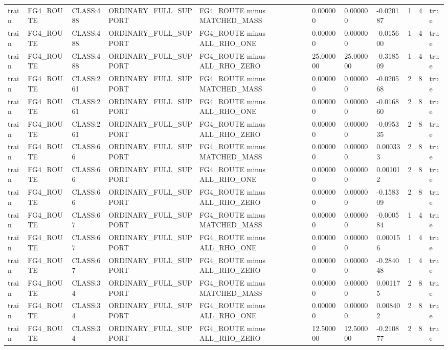 \begin{tabular}{lllllllllll}
train & FG4\_ROUTE & CLASS:488 & ORDINARY\_FULL\_SUPPORT & FG4\_ROUTE minus MATCHED\_MASS & 0.000000 & 0.000000 & -0.020187 & 1 & 4 & true \\
train & FG4\_ROUTE & CLASS:488 & ORDINARY\_FULL\_SUPPORT & FG4\_ROUTE minus ALL\_RHO\_ONE & 0.000000 & 0.000000 & -0.015600 & 1 & 4 & true \\
train & FG4\_ROUTE & CLASS:488 & ORDINARY\_FULL\_SUPPORT & FG4\_ROUTE minus ALL\_RHO\_ZERO & 25.000000 & 25.000000 & -0.318509 & 1 & 4 & true \\
train & FG4\_ROUTE & CLASS:261 & ORDINARY\_FULL\_SUPPORT & FG4\_ROUTE minus MATCHED\_MASS & 0.000000 & 0.000000 & -0.020568 & 2 & 8 & true \\
train & FG4\_ROUTE & CLASS:261 & ORDINARY\_FULL\_SUPPORT & FG4\_ROUTE minus ALL\_RHO\_ONE & 0.000000 & 0.000000 & -0.016860 & 2 & 8 & true \\
train & FG4\_ROUTE & CLASS:261 & ORDINARY\_FULL\_SUPPORT & FG4\_ROUTE minus ALL\_RHO\_ZERO & 0.000000 & 0.000000 & -0.095335 & 2 & 8 & true \\
train & FG4\_ROUTE & CLASS:66 & ORDINARY\_FULL\_SUPPORT & FG4\_ROUTE minus MATCHED\_MASS & 0.000000 & 0.000000 & 0.000333 & 2 & 8 & true \\
train & FG4\_ROUTE & CLASS:66 & ORDINARY\_FULL\_SUPPORT & FG4\_ROUTE minus ALL\_RHO\_ONE & 0.000000 & 0.000000 & 0.001012 & 2 & 8 & true \\
train & FG4\_ROUTE & CLASS:66 & ORDINARY\_FULL\_SUPPORT & FG4\_ROUTE minus ALL\_RHO\_ZERO & 0.000000 & 0.000000 & -0.158309 & 2 & 8 & true \\
train & FG4\_ROUTE & CLASS:67 & ORDINARY\_FULL\_SUPPORT & FG4\_ROUTE minus MATCHED\_MASS & 0.000000 & 0.000000 & -0.000584 & 1 & 4 & true \\
train & FG4\_ROUTE & CLASS:67 & ORDINARY\_FULL\_SUPPORT & FG4\_ROUTE minus ALL\_RHO\_ONE & 0.000000 & 0.000000 & 0.000156 & 1 & 4 & true \\
train & FG4\_ROUTE & CLASS:67 & ORDINARY\_FULL\_SUPPORT & FG4\_ROUTE minus ALL\_RHO\_ZERO & 0.000000 & 0.000000 & -0.284048 & 1 & 4 & true \\
train & FG4\_ROUTE & CLASS:34 & ORDINARY\_FULL\_SUPPORT & FG4\_ROUTE minus MATCHED\_MASS & 0.000000 & 0.000000 & 0.001175 & 2 & 8 & true \\
train & FG4\_ROUTE & CLASS:34 & ORDINARY\_FULL\_SUPPORT & FG4\_ROUTE minus ALL\_RHO\_ONE & 0.000000 & 0.000000 & 0.008402 & 2 & 8 & true \\
train & FG4\_ROUTE & CLASS:34 & ORDINARY\_FULL\_SUPPORT & FG4\_ROUTE minus ALL\_RHO\_ZERO & 12.500000 & 12.500000 & -0.210877 & 2 & 8 & true \\

\end{tabular}
